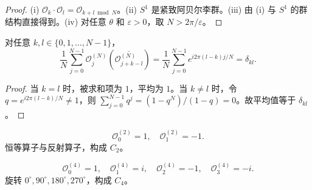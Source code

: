 \begin{proof}
(i) $\mathcal{O}_k \cdot \mathcal{O}_l = \mathcal{O}_{k+l \bmod N}$。(ii) $S^1$ 是紧致阿贝尔李群。(iii) 由 (i) 与 $S^1$ 的群结构直接得到。(iv) 对任意 $\theta$ 和 $\varepsilon > 0$，取 $N > 2\pi/\varepsilon$。
\end{proof}

\begin{proposition}[相位算子的正交性]\label{prop:phase_operator_orthogonality}
对任意 $k, l \in \{0, 1, \dots, N-1\}$，
\[
\frac{1}{N}\sum_{j=0}^{N-1} \mathcal{O}_j^{(N)}(\overline{\mathcal{O}_{j+k-l}^{(N)}})
= \frac{1}{N}\sum_{j=0}^{N-1} e^{i 2\pi (l-k) j / N}
= \delta_{kl}.
\]
\end{proposition}

\begin{proof}
当 $k=l$ 时，被求和项为 $1$，平均为 $1$。当 $k\neq l$ 时，令 $q=e^{i2\pi(l-k)/N}\neq 1$，则 $\sum_{j=0}^{N-1}q^j=(1-q^N)/(1-q)=0$。故平均值等于 $\delta_{kl}$。
\end{proof}

\begin{example}\label{ex:phase_operators_c2}
\[
\mathcal{O}_0^{(2)} = 1, \quad \mathcal{O}_1^{(2)} = -1.
\]
恒等算子与反射算子，构成 $C_2$。
\end{example}

\begin{example}\label{ex:phase_operators_c4}
\[
\mathcal{O}_0^{(4)} = 1, \quad \mathcal{O}_1^{(4)} = i, \quad \mathcal{O}_2^{(4)} = -1, \quad \mathcal{O}_3^{(4)} = -i.
\]
旋转 $0^\circ, 90^\circ, 180^\circ, 270^\circ$，构成 $C_4$。
\end{example}

